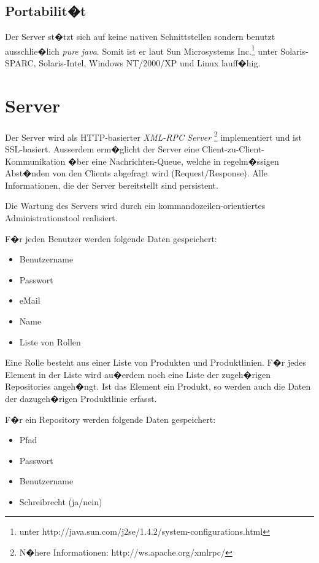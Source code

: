 \section{Portabilit�t}
Der Server st�tzt sich auf keine nativen Schnittstellen sondern benutzt ausschlie�lich 
\emph{pure java}. Somit ist er laut Sun Microsystems 
Inc.\footnote{unter http://java.sun.com/j2se/1.4.2/system-configurations.html} unter 
Solaris-SPARC, Solaris-Intel, Windows NT/2000/XP und Linux lauff�hig.


\chapter{Server}
Der Server wird als HTTP-basierter {\it XML-RPC Server}
\footnote{N�here Informationen: http://ws.apache.org/xmlrpc/}
implementiert und ist SSL-basiert. Ausserdem erm�glicht
der Server eine Client-zu-Client-Kommunikation �ber eine Nachrichten-Queue, welche
in regelm�ssigen Abst�nden von den Clients abgefragt wird (Request/Response).
Alle Informationen, die der Server bereitstellt sind persistent.\par
Die Wartung des Servers wird durch ein kommandozeilen-orientiertes
Administrationstool realisiert.\newline

F�r jeden Benutzer werden folgende Daten gespeichert:
\begin{itemize}
\item Benutzername
\item Passwort
\item eMail
\item Name
\item Liste von Rollen
\end{itemize}

Eine Rolle besteht aus einer Liste von Produkten und Produktlinien.\newline
F�r jedes Element in der Liste wird au�erdem noch eine Liste der zugeh�rigen Repositories angeh�ngt. 
Ist das Element ein Produkt, so werden auch die Daten der dazugeh�rigen Produktlinie erfasst.\newline

F�r ein Repository werden folgende Daten gespeichert:
\begin{itemize}
\item Pfad
\item Passwort
\item Benutzername
\item Schreibrecht (ja/nein)
\end{itemize}

